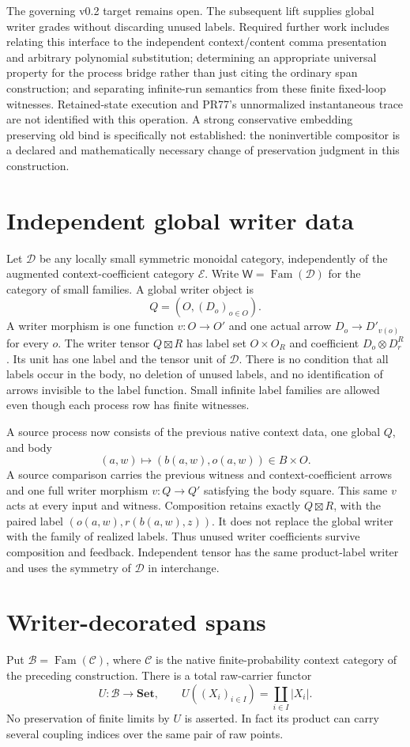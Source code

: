 \documentclass[11pt]{article}
\begin{document}
The governing v0.2 target remains open. The subsequent lift supplies global writer grades without discarding unused labels. Required further work includes relating this interface to the independent context/content comma presentation and arbitrary polynomial substitution; determining an appropriate universal property for the process bridge rather than just citing the ordinary span construction; and separating infinite-run semantics from these finite fixed-loop witnesses. Retained-state execution and PR77's unnormalized instantaneous trace are not identified with this operation. A strong conservative embedding preserving old bind is specifically not established: the noninvertible compositor is a declared and mathematically necessary change of preservation judgment in this construction.
\appendix
\section{Independent global writer data}
Let $\mathcal D$ be any locally small symmetric monoidal category, independently of the augmented context-coefficient category $\mathcal E$. Write $\mathsf W=\operatorname{Fam}(\mathcal D)$ for the category of small families. A global writer object is
\[
 Q=(O,(D_o)_{o\in O}).
\]
A writer morphism is one function $v:O\to O'$ and one actual arrow $D_o\to D'_{v(o)}$ for every $o$. The writer tensor $Q\boxtimes R$ has label set $O\times O_R$ and coefficient $D_o\otimes D^R_r$. Its unit has one label and the tensor unit of $\mathcal D$. There is no condition that all labels occur in the body, no deletion of unused labels, and no identification of arrows invisible to the label function. Small infinite label families are allowed even though each process row has finite witnesses.

A source process now consists of the previous native context data, one global $Q$, and body
\[
 (a,w)\longmapsto (b(a,w),o(a,w))\in B\times O.
\]
A source comparison carries the previous witness and context-coefficient arrows and one full writer morphism $v:Q\to Q'$ satisfying the body square. This same $v$ acts at every input and witness. Composition retains exactly $Q\boxtimes R$, with the paired label $(o(a,w),r(b(a,w),z))$. It does not replace the global writer with the family of realized labels. Thus unused writer coefficients survive composition and feedback. Independent tensor has the same product-label writer and uses the symmetry of $\mathcal D$ in interchange.

\section{Writer-decorated spans}
Put $\mathcal B=\operatorname{Fam}(\mathcal C)$, where $\mathcal C$ is the native finite-probability context category of the preceding construction. There is a total raw-carrier functor
\[
 U:\mathcal B\to\mathbf{Set},\qquad U((X_i)_{i\in I})=\coprod_{i\in I}|X_i|.
\]
No preservation of finite limits by $U$ is asserted. In fact its product can carry several coupling indices over the same pair of raw points.
\end{document}
